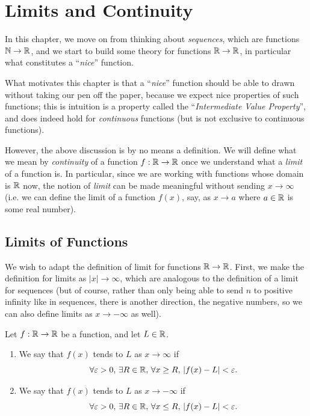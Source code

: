 \documentclass[../analysis1.tex]{subfiles}
\begin{document}
\chapter{Limits and Continuity}

In this chapter, we move on from thinking about \textit{sequences}, which are functions $\mathbb{N}\to\mathbb{R}$, and we start to build some theory for functions $\mathbb{R}\to\mathbb{R}$, in particular what constitutes a ``\textit{nice}'' function.\par
What motivates this chapter is that a ``\textit{nice}'' function should be able to drawn without taking our pen off the paper, because we expect nice properties of such functions; this is intuition is a property called the ``\textit{Intermediate Value Property}'', and does indeed hold for \textit{continuous} functions (but is not exclusive to continuous functions).\par
However, the above discussion is by no means a definition. We will define what we mean by \textit{continuity} of a function $f:\mathbb{R}\to\mathbb{R}$ once we understand what a \textit{limit} of a function is. In particular, since we are working with functions whose domain is $\mathbb{R}$ now, the notion of \textit{limit} can be made meaningful without sending $x\to\infty$ (i.e. we can define the limit of a function $f(x)$, say, as $x\to a$ where $a\in \mathbb{R}$ is some real number).


\section{Limits of Functions}
We wish to adapt the definition of limit for functions $\mathbb{R}\to\mathbb{R}$. First, we make the definition for limits as $|x|\to\infty$, which are analogous to the definition of a limit for sequences (but of course, rather than only being able to send $n$ to positive infinity like in sequences, there is another direction, the negative numbers, so we can also define limits as $x\to-\infty$ as well).

\begin{definition}
    \begin{shaded*}
        Let $f:\mathbb{R}\to\mathbb{R}$ be a function, and let $L\in\mathbb{R}$.
        \begin{enumerate}
            \item[1.] We say that $f(x)$ tends to $L$ as $x\to\infty$ if
            \[\forall \varepsilon>0,\,\exists R\in\mathbb{R},\, \forall x\ge R,\, |f(x)-L|<\varepsilon.\] 
            \item[2.] We say that $f(x)$ tends to $L$ as $x\to-\infty$ if
            \[\forall \varepsilon>0,\,\exists R\in\mathbb{R},\, \forall x\le R,\, |f(x)-L|<\varepsilon.\] 
        \end{enumerate}
    \end{shaded*}
\end{definition}
\end{document}
